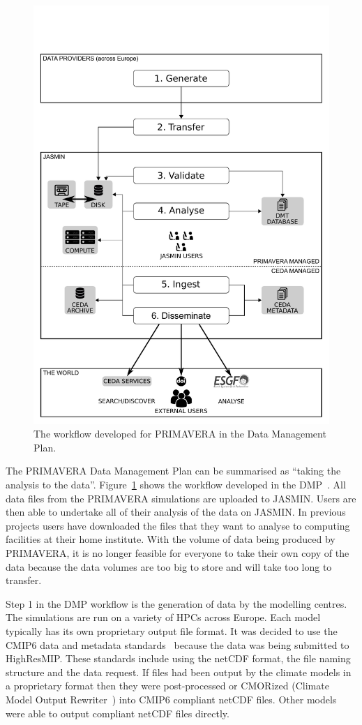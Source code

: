 \documentclass[gmd, manuscript]{copernicus}
\begin{document}
\begin{figure}[t]
\includegraphics[width=12cm]{fig01.pdf}
\caption{The workflow developed for PRIMAVERA in the Data Management Plan.}
\label{dmp_workflow}
\end{figure}

The PRIMAVERA Data Management Plan can be summarised as ``taking the analysis to the data''. Figure~\ref{dmp_workflow} shows the workflow developed in the DMP~\citep{Mizielinski2016}. All data files from the PRIMAVERA simulations are uploaded to JASMIN. Users are then able to undertake all of their analysis of the data on JASMIN. In previous projects users have downloaded the files that they want to analyse to computing facilities at their home institute. With the volume of data being produced by PRIMAVERA, it is no longer feasible for everyone to take their own copy of the data because the data volumes are too big to store and will take too long to transfer.

Step 1 in the DMP workflow is the generation of data by the modelling centres. The simulations are run on a variety of HPCs across Europe. Each model typically has its own proprietary output file format. It was decided to use the CMIP6 data and metadata standards~\citep{gmd-11-3659-2018} because the data was being submitted to HighResMIP. These standards include using the netCDF format, the file naming structure and the data request. If files had been output by the climate models in a proprietary format then they were post-processed or CMORized (Climate Model Output Rewriter~\citep{Nadeau2019}) into CMIP6 compliant netCDF files. Other models were able to output compliant netCDF files directly.
\end{document}
